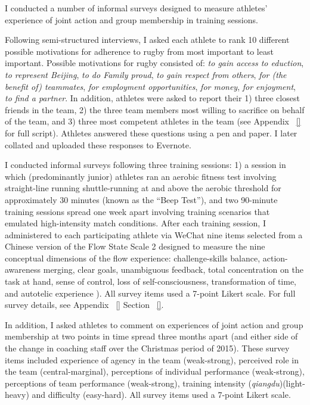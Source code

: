    I conducted a number of informal surveys designed to measure athletes' experience of joint action and group membership in training sessions.

   Following semi-structured interviews, I asked each athlete to rank 10 different possible motivations for adherence to rugby from most important to least important. Possible motivations for rugby consisted of: \textit{to gain access to eduction}, \textit{to represent Beijing}, \textit{to do Family proud}, \textit{to gain respect from others}, \textit{for (the benefit of) teammates}, \textit{for employment opportunities}, \textit{for money}, \textit{for enjoyment}, \textit{to find a partner}. In addition, athletes were asked to report their 1) three closest friends in the team, 2) the three team members most willing to sacrifice on behalf of the team, and 3) three most competent athletes in the team (see Appendix ~\ref{} for full script). Athletes answered these questions using a pen and paper. I later collated and uploaded these responses to Evernote.


    I conducted informal surveys following three training sessions: 1) a session in which (predominantly junior) athletes ran an aerobic fitness test involving straight-line running shuttle-running at and above the aerobic threshold for approximately 30 minutes (known as the ``Beep Test''), and two 90-minute training sessions spread one week apart involving training scenarios that emulated high-intensity match conditions.  After each training session, I administered to each participating athlete via WeChat nine items selected from a Chinese version of the Flow State Scale 2 \citep{Liu2012} designed to measure the nine conceptual dimensions of the flow experience: challenge-skills balance, action-awareness merging, clear goals, unambiguous feedback, total concentration on the task at hand, sense of control, loss of self-consciousness, transformation of time, and autotelic experience \citep{Csikszentmihalyi1990}).  All survey items used a 7-point Likert scale. For full survey details, see Appendix ~\ref{} Section ~\ref{}.


    In addition, I asked athletes to comment on experiences of joint action and group membership at two points in time spread three months apart (and either side of the change in coaching staff over the Christmas period of 2015).  These survey items included experience of agency in the team (weak-strong), perceived role in the team (central-marginal), perceptions of individual performance (weak-strong), perceptions of team performance (weak-strong), training intensity (\textit{qiangdu})(light-heavy) and difficulty (easy-hard).  All survey items used a 7-point Likert scale.


